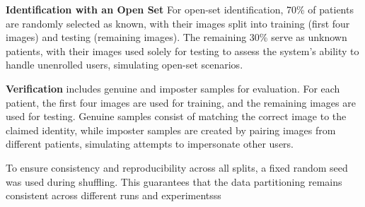 \textbf{Identification with an Open Set} For open-set identification, 70\% of patients are randomly selected as known, with their images split into training (first four images) and testing (remaining images). The remaining 30\% serve as unknown patients, with their images used solely for testing to assess the system's ability to handle unenrolled users, simulating open-set scenarios. 

\textbf{Verification} includes genuine and imposter samples for evaluation. For each patient, the first four images are used for training, and the remaining images are used for testing. Genuine samples consist of matching the correct image to the claimed identity, while imposter samples are created by pairing images from different patients, simulating attempts to impersonate other users. 

To ensure consistency and reproducibility across all splits, a fixed random seed was used during shuffling. This guarantees that the data partitioning remains consistent across different runs and experimentsss